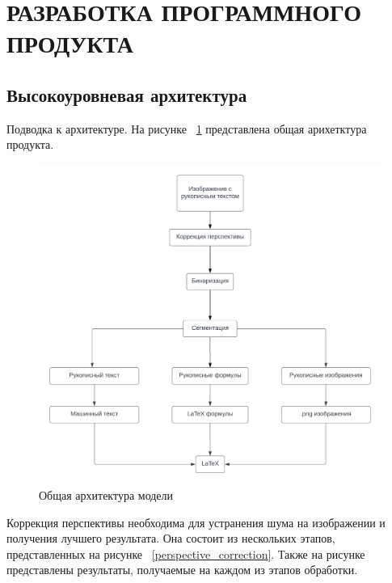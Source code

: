\section{РАЗРАБОТКА ПРОГРАММНОГО ПРОДУКТА}

\subsection{Высокоуровневая архитектура}

Подводка к архитектуре.
На рисунке ~\ref{neuro_model} представлена общая арихетктура продукта.

\begin{figure}
\includegraphics[scale=0.75]{img/Blank_diagram.png}
\caption{Общая архитектура модели}
\label{neuro_model}
\end{figure}

Коррекция перспективы необходима для устранения шума на изображении и получения лучшего результата. Она состоит из нескольких этапов, представленных на рисунке ~\ref{perspective_correction}. 
Также на рисунке представлены результаты, получаемые на каждом из этапов обработки.

